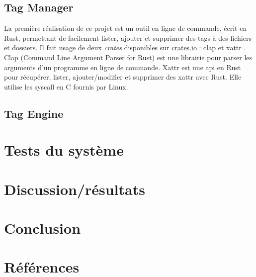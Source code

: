 \documentclass[a4paper, 12pt]{article}
\begin{document}
\subsection{Tag Manager}
La première réalisation de ce projet est un outil en ligne de commande, écrit en Rust, permettant 
de facilement lister, ajouter et supprimer des tags à des fichiers et dossiers. Il fait usage de 
deux \textit{crates} disponibles sur \href{https://crates.io}{crates.io} : clap \cite{ref22} et 
xattr \cite{ref23}. Clap (Command Line Argument Parser for Rust) est une librairie pour parser 
les arguments d'un programme en ligne de commande. Xattr est une \acrshort{api} en Rust pour récupérer, lister, 
ajouter/modifier et supprimer des \acrshort{xattr} avec Rust. Elle utilise les \acrshort{syscall} 
en C fournis par Linux.

\subsection{Tag Engine}\label{tag_engine_realisation}
\cite{ref26}
\newpage

\section{Tests du système} %
\newpage

\section{Discussion/résultats} %

\newpage

\section{Conclusion} %


\newpage
\section{Références} %


\end{document}

